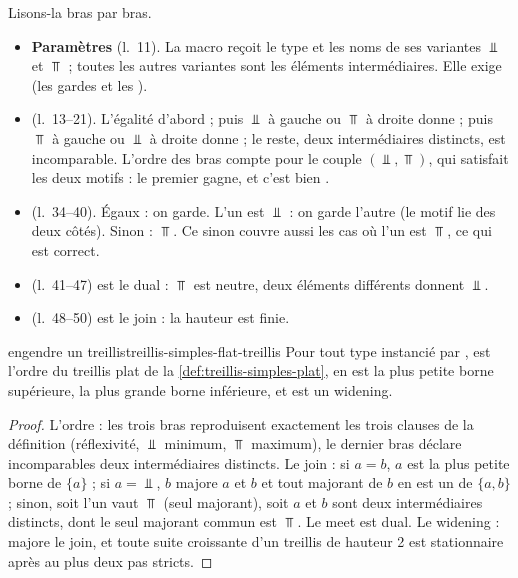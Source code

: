 Lisons-la bras par bras.
\begin{itemize}
  \item \textbf{Paramètres} (l.~11). La macro reçoit le type et les noms de
    ses variantes $\Bot$ et $\Top$ ; toutes les autres variantes sont les
    éléments intermédiaires. Elle exige  (les gardes
     et les ).
  \item \textbf{} (l.~13--21). L'égalité d'abord ; puis
    \og $\Bot$ à gauche ou $\Top$ à droite\fg{} donne  ; puis
    \og $\Top$ à gauche ou $\Bot$ à droite\fg{} donne  ; le reste,
    deux intermédiaires distincts, est incomparable. L'ordre des bras compte
    pour le couple $(\Bot, \Top)$, qui satisfait les deux motifs : le premier
    gagne, et c'est bien .
  \item \textbf{} (l.~34--40). Égaux : on garde. L'un est $\Bot$ :
    on garde l'autre (le motif  lie
     des deux côtés). Sinon : $\Top$. Ce \og sinon\fg{} couvre aussi les
    cas où l'un est $\Top$, ce qui est correct.
  \item \textbf{} (l.~41--47) est le dual : $\Top$ est neutre, deux
    éléments différents donnent $\Bot$.
  \item \textbf{} (l.~48--50) est le join : la hauteur est finie.
\end{itemize}

\begin{proposition}{ engendre un treillis}{treillis-simples-flat-treillis}
  Pour tout type instancié par ,  est
  l'ordre du treillis plat de la \cref{def:treillis-simples-plat}, 
  en est la plus petite borne supérieure,  la plus grande borne
  inférieure, et  est un widening.
\end{proposition}
\begin{proof}
  L'ordre : les trois bras reproduisent exactement les trois clauses de la
  définition (réflexivité, $\Bot$ minimum, $\Top$ maximum), le dernier bras
  déclare incomparables deux intermédiaires distincts. Le join : si
  $a = b$, $a$ est la plus petite borne de $\{a\}$ ; si $a = \Bot$, $b$ majore
  $a$ et $b$ et tout majorant de $b$ en est un de $\{a,b\}$ ; sinon, soit l'un
  vaut $\Top$ (seul majorant), soit $a$ et $b$ sont deux intermédiaires
  distincts, dont le seul majorant commun est $\Top$. Le meet est dual. Le
  widening :  majore le join, et toute suite croissante
  d'un treillis de hauteur 2 est stationnaire après au plus deux pas stricts.
\end{proof}

